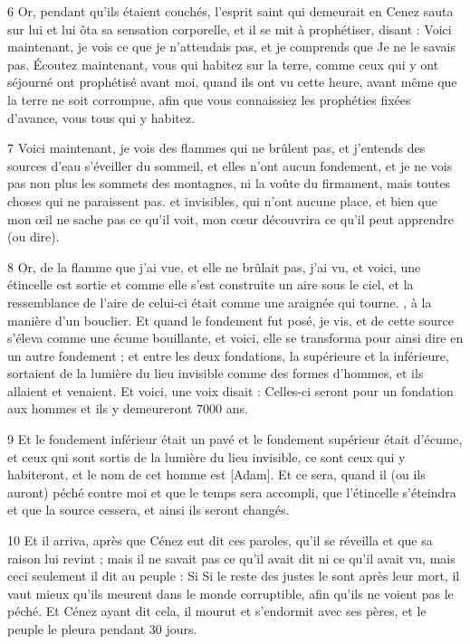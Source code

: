 \par 6 Or, pendant qu'ils étaient couchés, l'esprit saint qui demeurait en Cenez sauta sur lui et lui ôta sa sensation corporelle, et il se mit à prophétiser, disant : Voici maintenant, je vois ce que je n'attendais pas, et je comprends que Je ne le savais pas. Écoutez maintenant, vous qui habitez sur la terre, comme ceux qui y ont séjourné ont prophétisé avant moi, quand ils ont vu cette heure, avant même que la terre ne soit corrompue, afin que vous connaissiez les prophéties fixées d'avance, vous tous qui y habitez.

\par 7 Voici maintenant, je vois des flammes qui ne brûlent pas, et j'entends des sources d'eau s'éveiller du sommeil, et elles n'ont aucun fondement, et je ne vois pas non plus les sommets des montagnes, ni la voûte du firmament, mais toutes choses qui ne paraissent pas. et invisibles, qui n'ont aucune place, et bien que mon œil ne sache pas ce qu'il voit, mon cœur découvrira ce qu'il peut apprendre (ou dire).

\par 8 Or, de la flamme que j'ai vue, et elle ne brûlait pas, j'ai vu, et voici, une étincelle est sortie et comme elle s'est construite un aire sous le ciel, et la ressemblance de l'aire de celui-ci était comme une araignée qui tourne. , à la manière d'un bouclier. Et quand le fondement fut posé, je vis, et de cette source s'éleva comme une écume bouillante, et voici, elle se transforma pour ainsi dire en un autre fondement ; et entre les deux fondations, la supérieure et la inférieure, sortaient de la lumière du lieu invisible comme des formes d'hommes, et ils allaient et venaient. Et voici, une voix disait : Celles-ci seront pour un fondation aux hommes et ils y demeureront 7000 ans.

\par 9 Et le fondement inférieur était un pavé et le fondement supérieur était d'écume, et ceux qui sont sortis de la lumière du lieu invisible, ce sont ceux qui y habiteront, et le nom de cet homme est [Adam]. Et ce sera, quand il (ou ils auront) péché contre moi et que le temps sera accompli, que l'étincelle s'éteindra et que la source cessera, et ainsi ils seront changés.

\par 10 Et il arriva, après que Cénez eut dit ces paroles, qu'il se réveilla et que sa raison lui revint ; mais il ne savait pas ce qu'il avait dit ni ce qu'il avait vu, mais ceci seulement il dit au peuple : Si Si le reste des justes le sont après leur mort, il vaut mieux qu'ils meurent dans le monde corruptible, afin qu'ils ne voient pas le péché. Et Cénez ayant dit cela, il mourut et s'endormit avec ses pères, et le peuple le pleura pendant 30 jours.



